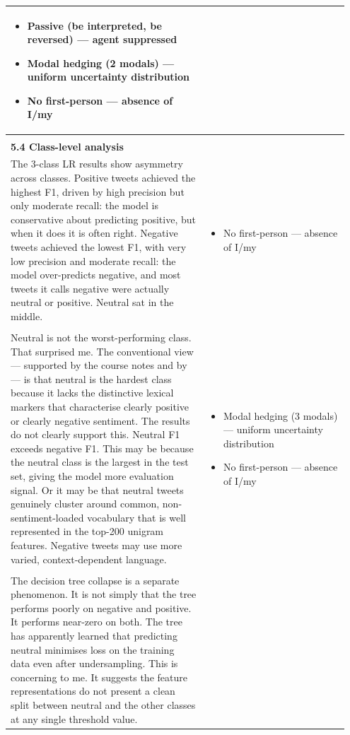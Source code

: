 \documentclass[11pt]{article}
\begin{document}
\begin{longtable}{|p{0.55\linewidth}|p{0.40\linewidth}|}
\begin{itemize}[leftmargin=1em,itemsep=1pt,topsep=1pt,parsep=0pt]
  \item Passive (be interpreted, be reversed) --- agent suppressed
  \item Modal hedging (2 modals) --- uniform uncertainty distribution
  \item No first-person --- absence of I/my
\end{itemize} \\[2pt]
\hline
\rule{0pt}{3.5cm} & \\
\hline
\textbf{5.4 Class-level analysis}\\[4pt]
The 3-class LR results show asymmetry across classes. Positive tweets achieved the highest F1, driven by high precision but only moderate recall: the model is conservative about predicting positive, but when it does it is often right. Negative tweets achieved the lowest F1, with very low precision and moderate recall: the model over-predicts negative, and most tweets it calls negative were actually neutral or positive. Neutral sat in the middle. & \begin{itemize}[leftmargin=1em,itemsep=1pt,topsep=1pt,parsep=0pt]
  \item No first-person --- absence of I/my
\end{itemize} \\[2pt]
\hline
\rule{0pt}{3.5cm} & \\
\hline
Neutral is not the worst-performing class. That surprised me. The conventional view --- supported by the course notes and by --- is that neutral is the hardest class because it lacks the distinctive lexical markers that characterise clearly positive or clearly negative sentiment. The results do not clearly support this. Neutral F1 exceeds negative F1. This may be because the neutral class is the largest in the test set, giving the model more evaluation signal. Or it may be that neutral tweets genuinely cluster around common, non-sentiment-loaded vocabulary that is well represented in the top-200 unigram features. Negative tweets may use more varied, context-dependent language. & \begin{itemize}[leftmargin=1em,itemsep=1pt,topsep=1pt,parsep=0pt]
  \item Modal hedging (3 modals) --- uniform uncertainty distribution
  \item No first-person --- absence of I/my
\end{itemize} \\[2pt]
\hline
\rule{0pt}{3.5cm} & \\
\hline
The decision tree collapse is a separate phenomenon. It is not simply that the tree performs poorly on negative and positive. It performs near-zero on both. The tree has apparently learned that predicting neutral minimises loss on the training data even after undersampling. This is concerning to me. It suggests the feature representations do not present a clean split between neutral and the other classes at any single threshold value. & \begin{itemize}[leftmargin=1em,itemsep=1pt,topsep=1pt,parsep=0pt]

\end{itemize}
\end{longtable}
\end{document}
